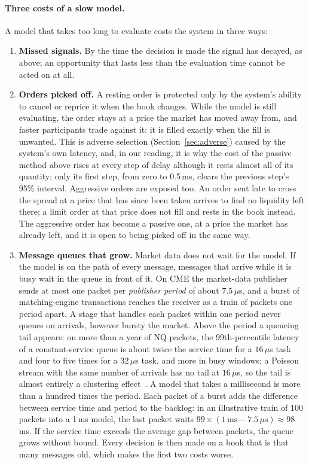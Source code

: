 \paragraph{Three costs of a slow model.} A model that takes too long to evaluate costs the system in three ways:
\begin{enumerate}[leftmargin=1.5em]
\item \textbf{Missed signals.} By the time the decision is made the signal has decayed, as above; an opportunity
  that lasts less than the evaluation time cannot be acted on at all.
\item \textbf{Orders picked off.} A resting order is protected only by the system's ability to cancel or
  reprice it when the book changes. While the model is still evaluating, the order stays at a price the market has
  moved away from, and faster participants trade against it: it is filled exactly when the fill is unwanted. This
  is adverse selection (Section~\ref{sec:adverse}) caused by the system's own latency, and, in our reading, it is why the cost of the
  passive method above rises at every step of delay although it rests almost all of its quantity; only its first
  step, from zero to 0.5\,ms, clears the previous step's 95\% interval. Aggressive orders
  are exposed too. An order sent late to cross the spread at a price that has since been taken arrives to find no
  liquidity left there; a limit order at that price does not fill and rests in the book instead. The aggressive order
  has become a passive one, at a price the market has already left, and it is open to being picked off in the same
  way.
\item \textbf{Message queues that grow.} Market data does not wait for the model. If the model is on the path of
  every message, messages that arrive while it is busy wait in the queue in front of it. On CME the market-data
  publisher sends at most one packet per \emph{publisher period} of about $7.5\,\mu$s, and a burst of
  matching-engine transactions reaches the receiver as a train of packets one period apart. A stage that handles
  each packet within one period never queues on arrivals, however bursty the market. Above the period a queueing
  tail appears: on more than a year of NQ packets, the 99th-percentile latency of a constant-service queue is about
  twice the service time for a $16\,\mu$s task and four to five times for a $32\,\mu$s task, and more in busy
  windows; a Poisson stream with the same number of arrivals has no tail at $16\,\mu$s, so the tail is almost
  entirely a clustering effect~\citep{maciejewski2026packets}. A model that takes a millisecond is more than a
  hundred times the period. Each packet of a burst adds the difference between service time and period to the
  backlog: in an illustrative train of 100 packets into a 1\,ms model, the last packet waits
  $99 \times (1\,\mathrm{ms} - 7.5\,\mu\mathrm{s}) \approx 98$\,ms. If the service time exceeds the average gap
  between packets, the queue grows without bound. Every decision is then made on a book that is that many messages
  old, which makes the first two costs worse.
\end{enumerate}
